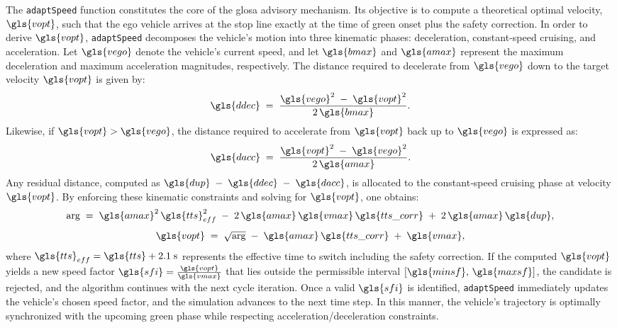 The \texttt{adaptSpeed} function constitutes the core of the \ac{glosa} advisory mechanism. Its objective is to compute a theoretical optimal velocity, $\gls{vopt}$, such that the ego vehicle arrives at the stop line exactly at the time of green onset plus the safety correction. In order to derive $\gls{vopt}$, \texttt{adaptSpeed} decomposes the vehicle’s motion into three kinematic phases: deceleration, constant‐speed cruising, and acceleration. Let $\gls{vego}$ denote the vehicle’s current speed, and let $\gls{bmax}$ and $\gls{amax}$ represent the maximum deceleration and maximum acceleration magnitudes, respectively. The distance required to decelerate from $\gls{vego}$ down to the target velocity $\gls{vopt}$ is given by:
\begin{equation}
\gls{ddec} \;=\; \frac{\gls{vego}^2 \;-\; \gls{vopt}^2}{2\,\gls{bmax}}.
\end{equation}
Likewise, if $\gls{vopt} > \gls{vego}$, the distance required to accelerate from $\gls{vopt}$ back up to $\gls{vego}$ is expressed as:
\begin{equation}
\gls{dacc} \;=\; \frac{\gls{vopt}^2 \;-\; \gls{vego}^2}{2\,\gls{amax}}.
\end{equation}
Any residual distance, computed as $\gls{dup} \;-\; \gls{ddec} \;-\; \gls{dacc}$, is allocated to the constant‐speed cruising phase at velocity $\gls{vopt}$. By enforcing these kinematic constraints and solving for $\gls{vopt}$, one obtains:
\begin{equation}
\mathrm{arg} \;=\; \gls{amax}^2\,\gls{tts}_{eff}^2 \;-\; 2\,\gls{amax}\,\gls{vmax}\,\gls{tts\_corr} \;+\; 2\,\gls{amax}\,\gls{dup},
\end{equation}
\begin{equation}
\gls{vopt} \;=\; \sqrt{\mathrm{arg}} \;-\; \gls{amax}\,\gls{tts\_corr} \;+\; \gls{vmax},
\end{equation}
where $\gls{tts}_{eff} = \gls{tts} + 2.1 \;\text{s}$ represents the effective time to switch including the safety correction. If the computed $\gls{vopt}$ yields a new speed factor $\gls{sfi} = \frac{\gls{vopt}}{\gls{vmax}}$ that lies outside the permissible interval $[\gls{minsf},\,\gls{maxsf}]$, the candidate is rejected, and the algorithm continues with the next cycle iteration. Once a valid $\gls{sfi}$ is identified, \texttt{adaptSpeed} immediately updates the vehicle’s chosen speed factor, and the simulation advances to the next time step. In this manner, the vehicle’s trajectory is optimally synchronized with the upcoming green phase while respecting acceleration/deceleration constraints.

